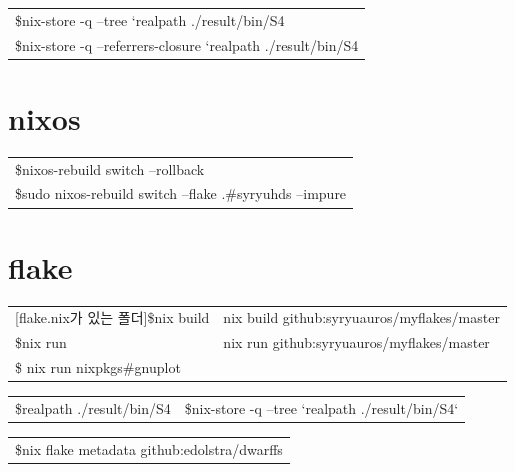 \documentclass[11pt]{article}
\begin{document}
\begin{center}
\begin{tabular}{l}
\$nix-store -q --tree `realpath ./result/bin/S4\\
\$nix-store -q --referrers-closure `realpath ./result/bin/S4\\
\end{tabular}
\end{center}

\section{nixos}
\label{sec:orgfa00cac}
\begin{center}
\begin{tabular}{l}
\$nixos-rebuild switch --rollback\\
[flake.nix가 있는 폴더]\$sudo nixos-rebuild switch --flake .\#syryuhds --impure\\
\end{tabular}
\end{center}

\section{flake}
\label{sec:org23b5db3}
\begin{center}
\begin{tabular}{ll}
[flake.nix가 있는 폴더]\$nix build & nix build  github:syryuauros/myflakes/master\\
[flake.nix가 있는 폴더]\$nix run & nix run  github:syryuauros/myflakes/master\\
\$ nix run nixpkgs\#gnuplot\\
\end{tabular}
\end{center}

\begin{center}
\begin{tabular}{ll}
\$realpath ./result/bin/S4 & \$nix-store -q --tree `realpath ./result/bin/S4`\\
\end{tabular}
\end{center}

\begin{center}
\begin{tabular}{l}
\$nix flake metadata github:edolstra/dwarffs\\
\end{tabular}
\end{center}
\end{document}
